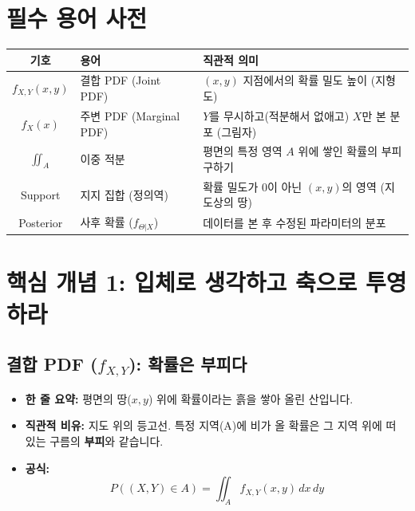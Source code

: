 \documentclass[11pt,a4paper]{book}
\theoremstyle{definition}
\begin{document}
\section{필수 용어 사전}

\begin{center}
\begin{tabular}{|c|l|l|}
\hline
\rowcolor{mainblue!20} \textbf{기호} & \textbf{용어} & \textbf{직관적 의미} \\ \hline
$f_{X,Y}(x,y)$ & 결합 PDF (Joint PDF) & $(x,y)$ 지점에서의 확률 밀도 높이 (지형도) \\ \hline
$f_X(x)$ & 주변 PDF (Marginal PDF) & $Y$를 무시하고(적분해서 없애고) $X$만 본 분포 (그림자) \\ \hline
$\iint_A$ & 이중 적분 & 평면의 특정 영역 $A$ 위에 쌓인 확률의 부피 구하기 \\ \hline
Support & 지지 집합 (정의역) & 확률 밀도가 0이 아닌 $(x,y)$의 영역 (지도상의 땅) \\ \hline
Posterior & 사후 확률 ($f_{\Theta|X}$) & 데이터를 본 후 수정된 파라미터의 분포 \\ \hline
\end{tabular}
\end{center}

\section{핵심 개념 1: 입체로 생각하고 축으로 투영하라}
 

\subsection{결합 PDF ($f_{X,Y}$): 확률은 부피다}
\begin{conceptbox}[title={지형도(Surface)의 부피 구하기}]
\begin{itemize}
    \item \textbf{한 줄 요약:} 평면의 땅($x,y$) 위에 확률이라는 흙을 쌓아 올린 산입니다.
    \item \textbf{직관적 비유:} 지도 위의 등고선. 특정 지역(A)에 비가 올 확률은 그 지역 위에 떠 있는 구름의 \textbf{부피}와 같습니다.
    \item \textbf{공식:}
    \[ P((X,Y) \in A) = \iint_A f_{X,Y}(x,y) \, dx \, dy \]
\end{itemize}
\end{conceptbox}
\end{document}
